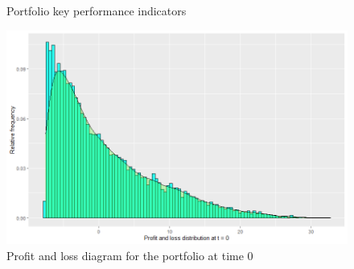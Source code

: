 \documentclass{beamer}
\begin{document}
\begin{frame}
    \begin{figure}[ht!]
        \centering
        \caption{Portfolio key performance indicators}
     \label{fig:kpi}
     \end{figure}
\end{frame}

\begin{frame}
    \begin{figure}[!ht]
        \centering
        \caption{Profit and loss diagram for the portfolio
                at time 0}
        \label{fig:port_pal_0}
        \includegraphics[scale=0.35]{portfolio_pal_0.png}
     \end{figure}
\end{frame}
\end{document}
